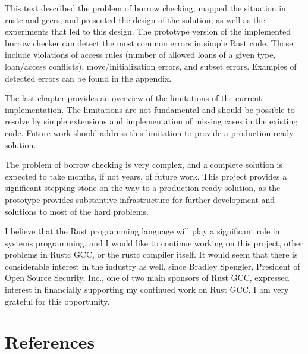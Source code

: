 \documentclass[
  11pt,
  twoside,symmetric]{report}
\begin{document}
This text described the problem of borrow checking, mapped the situation
in rustc and gccrs, and presented the design of the solution, as well as
the experiments that led to this design. The prototype version of the
implemented borrow checker can detect the most common errors in simple
Rust code. Those include violations of access rules (number of allowed
loans of a given type, loan/access conflicts), move/initialization
errors, and subset errors. Examples of detected errors can be found in
the appendix.

The last chapter provides an overview of the limitations of the current
implementation. The limitations are not fundamental and should be
possible to resolve by simple extensions and implementation of missing
cases in the existing code. Future work should address this limitation
to provide a production-ready solution.

The problem of borrow checking is very complex, and a complete solution
is expected to take months, if not years, of future work. This project
provides a significant stepping stone on the way to a production ready
solution, as the prototype provides substantive infrastructure for
further development and solutions to most of the hard problems.

I believe that the Rust programming language will play a significant
role in systems programming, and I would like to continue working on
this project, other problems in Rustc GCC, or the rustc compiler itself.
It would seem that there is considerable interest in the industry as
well, since Bradley Spengler, President of Open Source Security, Inc.,
one of two main sponsors of Rust GCC, expressed interest in financially
supporting my continued work on Rust GCC. I am very grateful for this
opportunity.

\appendix

\chapter{References}\label{references}
\end{document}
